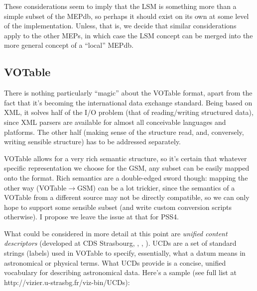 \documentclass[10pt]{article}
\begin{document}
These considerations seem to imply that the LSM is something more than a simple
subset of the MEPdb, so perhaps it should exist on its own at some level of the
implementation. Unless, that is, we decide that similar considerations apply to
the other MEPs, in which case the LSM concept can be merged into the more
general concept of a ``local'' MEPdb.

\subsection{VOTable}

There is nothing particularly ``magic'' about the VOTable format, apart from
the fact that it's becoming the international data exchange standard. Being
based on XML, it solves half of the I/O problem (that of reading/writing
structured data), since XML parsers are available for almost all conceivable
languages and platforms. The other half (making sense of the structure read,
and, conversely, writing sensible structure) has to be addressed separately.

VOTable allows for a very rich semantic structure, so it's certain that
whatever specific representation we choose for the GSM, any subset can be
easily mapped onto the format. Rich semantics are a double-edged sword though:
mapping the other way (VOTable$\rightarrow$GSM) can be a lot trickier, since
the  semantics of a VOTable from a different source may not be directly
compatible, so we can only hope to support some sensible subset (and write
custom conversion scripts otherwise). I propose we leave the issue at that for
PSS4.

What could be considered in more detail at this point are {\em unified content
descriptors} (developed at CDS Strasbourg, \cite{UCD1}, \cite{UCD2},
\cite{UCD3}). UCDs are a set of standard strings (labels) used in VOTable to
specify, essentially, what a datum means in astronomical or physical terms.
What UCDs provide is a concise, unified vocabulary for describing astronomical
data. Here's a sample (see full list at
http://vizier.u-strasbg.fr/viz-bin/UCDs):
\end{document}
